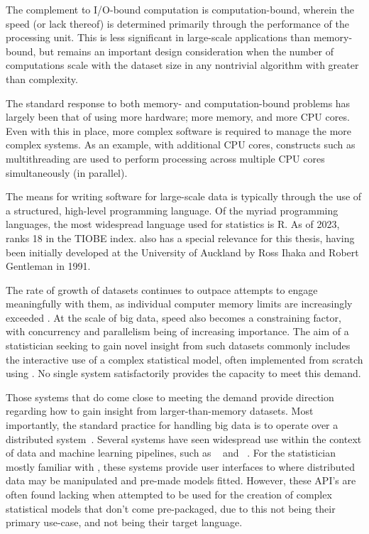 The complement to I/O-bound computation is computation-bound, wherein the speed (or lack thereof) is determined primarily through the performance of the processing unit.
This is less significant in large-scale applications than memory-bound, but remains an important design consideration when the number of computations scale with the dataset size in any nontrivial algorithm with greater than  complexity.

The standard response to both memory- and computation-bound problems has largely been that of using more hardware; more memory, and more CPU cores.
Even with this in place, more complex software is required to manage the more complex systems.
As an example, with additional CPU cores, constructs such as multithreading are used to perform processing across multiple CPU cores simultaneously (in parallel).

The means for writing software for large-scale data is typically through the use of a structured, high-level programming language.
Of the myriad programming languages, the most widespread language used for statistics is R.
As of 2023, \R{} ranks {18} in the TIOBE index.
\R{} also has a special relevance for this thesis, having been
initially developed at the University of Auckland by Ross Ihaka and
Robert Gentleman in 1991\cite{ihaka1996r}.

The rate of growth of datasets continues to outpace attempts to engage meaningfully with them, as individual computer memory limits are increasingly exceeded \cite{kleppmann2017dataintensive}.
At the scale of big data, speed also becomes a constraining factor, with concurrency and parallelism being of increasing importance.
The aim of a statistician seeking to gain novel insight from such datasets commonly includes the interactive use of a complex statistical model, often implemented from scratch using \R{}.
No single system satisfactorily provides the capacity to meet this demand.

Those systems that do come close to meeting the demand provide direction regarding how to gain insight from larger-than-memory datasets.
Most importantly, the standard practice for handling big data is to operate over a distributed system~\cite{boja2012distributed}.
Several systems have seen widespread use within the context of data and machine learning pipelines, such as ~\cite{zaharia2016apache} and ~\cite{shvachko2010hadoop}.
For the statistician mostly familiar with \R{}, these systems provide user interfaces to \R{} where distributed data may be manipulated and pre-made models fitted.
However, these API's are often found lacking when attempted to be used for the creation of complex statistical models that don't come pre-packaged, due to this not being their primary use-case, and \R{} not being their target language.

